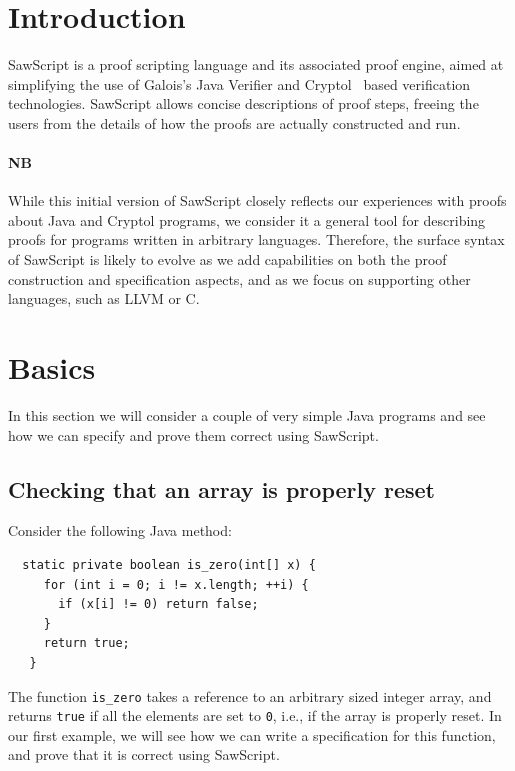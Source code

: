 \documentclass[12pt]{galois-whitepaper}
\author{The Galois HA Java Team\\\texttt{hajava@galois.com}}
\title{\sawScript}
\date{January 2012}
\newcommand{\sawScript}{{\sc SawScript}\xspace}
\begin{document}
\maketitle

\vspace*{2cm}
\begin{abstract}
We introduce the \sawScript language, aiming to provide
a programmable interface to Galois's Java Verifier and Cryptol based
formal verification technologies. We use various simple Java programs as examples, inspired
the domain of elliptic-curve cryptography. Our proofs either directly take place within the
\sawScript specification language, or use \sawScript to equivalence check Java functions against
their Cryptol counterparts.
\end{abstract}

\newpage
\tableofcontents
\newpage

\section{Introduction}
\sawScript is a proof scripting language and its associated proof engine, aimed at simplifying the use of Galois's Java Verifier and Cryptol~\cite{Cryptol} based
verification technologies. \sawScript allows concise descriptions of proof steps, freeing the users from the details
of how the proofs are actually constructed and run.

\paragraph{NB} While this initial version of \sawScript closely reflects our experiences with proofs about Java and Cryptol
programs, we consider it a general tool for describing proofs for programs written in arbitrary languages.
Therefore, the surface
syntax of \sawScript is likely to evolve as we add capabilities on both the proof construction and specification
aspects, and as we focus on supporting other languages, such as LLVM or C.

\section{Basics}
In this section we will consider a couple of very simple Java programs and see how we can specify and prove them correct
using \sawScript.

\subsection{Checking that an array is properly reset}
Consider the following Java method:
\begin{Verbatim}
  static private boolean is_zero(int[] x) {
     for (int i = 0; i != x.length; ++i) {
       if (x[i] != 0) return false;
     }
     return true;
   }
\end{Verbatim}
The function {\tt is\_zero} takes a reference to an arbitrary sized integer array, and returns {\tt true} if all the elements
are set to {\tt 0}, i.e., if the array is properly reset. In our first example, we will see how we can write a
specification for this function, and prove that it is correct using \sawScript.
\end{document}
